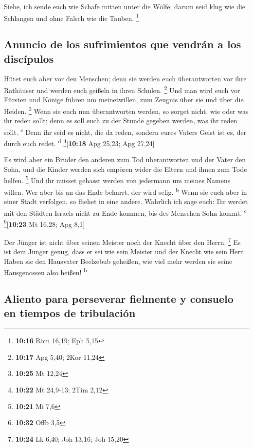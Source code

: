  Siehe, ich sende euch wie Schafe mitten unter die Wölfe;
darum seid klug wie die Schlangen und ohne Falsch wie die Tauben.
\footnote{\textbf{10:16} Röm 16,19; Eph 5,15}

\hypertarget{anuncio-de-los-sufrimientos-que-vendruxe1n-a-los-discuxedpulos}{%
\subsection{Anuncio de los sufrimientos que vendrán a los
discípulos}\label{anuncio-de-los-sufrimientos-que-vendruxe1n-a-los-discuxedpulos}}

 Hütet euch aber vor den Menschen; denn sie werden euch
überantworten vor ihre Rathäuser und werden euch geißeln in ihren
Schulen. \footnote{\textbf{10:17} Apg 5,40; 2Kor 11,24} 
Und man wird euch vor Fürsten und Könige führen um meinetwillen, zum
Zeugnis über sie und über die Heiden. \footnote{\textbf{10:25} Mt 12,24}
 Wenn sie euch nun überantworten werden, so sorget nicht,
wie oder was ihr reden sollt; denn es soll euch zu der Stunde gegeben
werden, was ihr reden sollt. \textsuperscript{c}  Denn
ihr seid es nicht, die da reden, sondern eures Vaters Geist ist es, der
durch euch redet. \textsuperscript{d} \footnote{\textbf{10:22} Mt
  24,9-13; 2Tim 2,12}{[}\textbf{10:18} Apg 25,23; Apg 27,24{]}

 Es wird aber ein Bruder den anderen zum Tod
überantworten und der Vater den Sohn, und die Kinder werden sich empören
wider die Eltern und ihnen zum Tode helfen. \footnote{\textbf{10:21} Mi
  7,6}  Und ihr müsset gehasst werden von jedermann um
meines Namens willen. Wer aber bis an das Ende beharrt, der wird selig.
\textsuperscript{b}  Wenn sie euch aber in einer Stadt
verfolgen, so fliehet in eine andere. Wahrlich ich sage euch: Ihr werdet
mit den Städten Israels nicht zu Ende kommen, bis des Menschen Sohn
kommt. \textsuperscript{c} \footnote{\textbf{10:32} Offb 3,5}{[}\textbf{10:23}
Mt 16,28; Apg 8,1{]}

 Der Jünger ist nicht über seinen Meister noch der Knecht
über den Herrn. \footnote{\textbf{10:24} Lk 6,40; Joh 13,16; Joh 15,20}
 Es ist dem Jünger genug, dass er sei wie sein Meister
und der Knecht wie sein Herr. Haben sie den Hausvater Beelzebub
geheißen, wie viel mehr werden sie seine Hausgenossen also heißen!
\textsuperscript{b}

\hypertarget{aliento-para-perseverar-fielmente-y-consuelo-en-tiempos-de-tribulaciuxf3n}{%
\subsection{Aliento para perseverar fielmente y consuelo en tiempos de
tribulación}\label{aliento-para-perseverar-fielmente-y-consuelo-en-tiempos-de-tribulaciuxf3n}}

